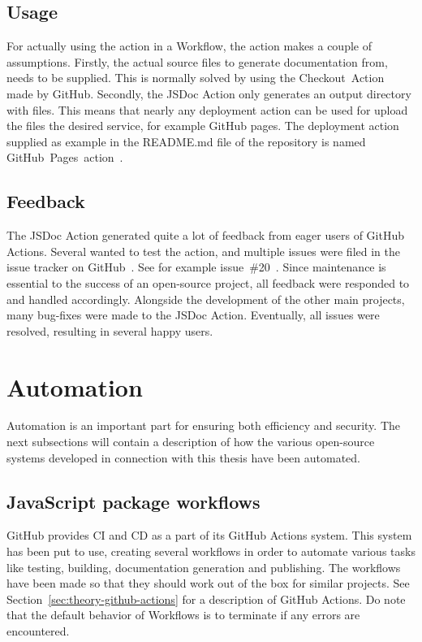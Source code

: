 \subsection{Usage}
For actually using the action in a Workflow, the action makes a couple of assumptions. Firstly, the actual source files to generate documentation from, needs to be supplied. This is normally solved by using the Checkout~Action~\cite{checkout-action} made by GitHub. Secondly, the JSDoc Action only generates an output directory with files. This means that nearly any deployment action can be used for upload the files the desired service, for example GitHub pages. The deployment action supplied as example in the README.md file of the repository is named GitHub~Pages~action~\cite{github-pages-action}.

\subsection{Feedback}
The JSDoc Action generated quite a lot of feedback from eager users of GitHub Actions. Several wanted to test the action, and multiple issues were filed in the issue tracker on GitHub~\cite{jsdoc-action-issue-tracker}. See for example issue~\#20~\cite{jsdoc-issue-20}. Since maintenance is essential to the success of an open-source project, all feedback were responded to and handled accordingly. Alongside the development of the other main projects, many bug-fixes were made to the JSDoc Action. Eventually, all issues were resolved, resulting in several happy users.

\section{Automation}
Automation is an important part for ensuring both efficiency and security. The next subsections will contain a description of how the various open-source systems developed in connection with this thesis have been automated.

\subsection{JavaScript package workflows}
\label{sec:method-javascript-package-workflows}
GitHub provides CI and CD as a part of its GitHub Actions system. This system has been put to use, creating several workflows in order to automate various tasks like testing, building, documentation generation and publishing. The workflows have been made so that they should work out of the box for similar projects. See Section~\ref{sec:theory-github-actions} for a description of GitHub Actions. Do note that the default behavior of Workflows is to terminate if any errors are encountered.

